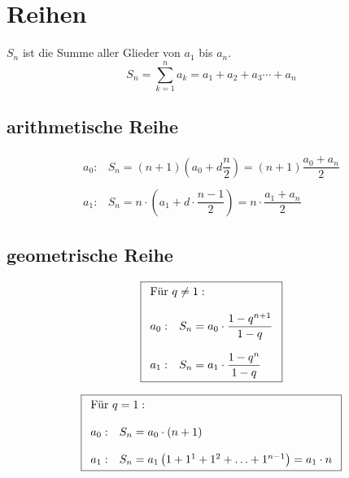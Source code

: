 



\section{Reihen}
$S_n$ ist die Summe aller Glieder von $a_1$ bis $a_n$. 
\[ \boxed{S_n = \sum_{k=1}^{n} a_k = a_1 + a_2 + a_3 \cdots + a_n} \]

\subsection{arithmetische Reihe}
\[ \boxed{\begin{matrix}
a_0 :&S_n = \left(n + 1\right)\left(a_0 + d \dfrac{n}{2}\right) 
= \left(n + 1\right) \dfrac{a_0 + a_n}{2}\\\\
a_1 :&S_n = n \cdot \left(a_1 + d \cdot \dfrac{n - 1}{2}\right) 
= n \cdot \dfrac{a_1 + a_n}{2}
\end{matrix}} \]

\subsection{geometrische Reihe}
\[ \boxed{\begin{array}{ll}
\multicolumn{2}{l}{\text{Für } q \neq 1: }\\\\
a_0 :& S_n = a_0 \cdot \dfrac{1-q^{n+1}}{1-q} \\ 
& \\
a_1 :& S_n = a_1 \cdot \dfrac{1-q^n}{1-q}
\end{array}} \]

\[ \boxed{\begin{array}{ll}
\multicolumn{2}{l}{\text{Für } q = 1: }\\\\
a_0 :& S_n = a_0 \cdot (n + 1)\\\\
a_1 :& S_n = a_1 \left(1+1^1 + 1^2 + \ldots + 1^{n-1}\right) = a_1 \cdot n
\end{array}} \]

